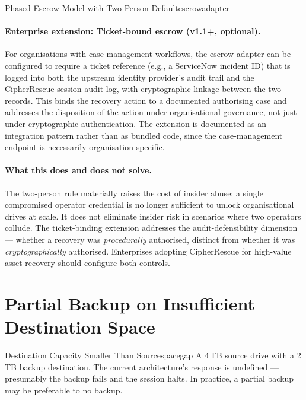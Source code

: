 \documentclass[11pt,a4paper]{report}
\begin{document}
\begin{solution}{Phased Escrow Model with Two-Person Default}{escrowadapter}
\paragraph{Enterprise extension: Ticket-bound escrow (v1.1+, optional).}
For organisations with case-management workflows, the escrow adapter can be configured to require a ticket reference (e.g., a ServiceNow incident ID) that is logged into both the upstream identity provider's audit trail and the CipherRescue session audit log, with cryptographic linkage between the two records. This binds the recovery action to a documented authorising case and addresses the disposition of the action under organisational governance, not just under cryptographic authentication. The extension is documented as an integration pattern rather than as bundled code, since the case-management endpoint is necessarily organisation-specific.

\paragraph{What this does and does not solve.} The two-person rule materially raises the cost of insider abuse: a single compromised operator credential is no longer sufficient to unlock organisational drives at scale. It does not eliminate insider risk in scenarios where two operators collude. The ticket-binding extension addresses the audit-defensibility dimension --- whether a recovery was \emph{procedurally} authorised, distinct from whether it was \emph{cryptographically} authorised. Enterprises adopting CipherRescue for high-value asset recovery should configure both controls.
\end{solution}

\section{Partial Backup on Insufficient Destination Space}

\begin{edgecase}{Destination Capacity Smaller Than Source}{spacegap}
A 4\,TB source drive with a 2\,TB backup destination. The current architecture's response is undefined --- presumably the backup fails and the session halts. In practice, a partial backup may be preferable to no backup.
\end{edgecase}
\end{document}
